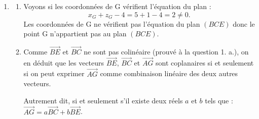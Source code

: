 \documentclass[10pt]{article}
\providecommand{\vect}[1]{\overrightarrow{#1}}
\begin{document}
\begin{enumerate}
\begin{enumerate}
\item Par propriété, on en déduit qu'une équation cartésienne du plan $(BCE)$ est de la forme $3\times x+0\times y+3\times z+d=0$.

B étant un point du plan $(BCE)$, ses coordonnées doivent vérifier l'équation du plan.
\[
B\in (BCE)\Longleftrightarrow 3\times 1+3\times 3+d=0
\Longleftrightarrow 12+d=0
\Longleftrightarrow d=-12.
\]
Une équation cartésienne du plan est donc $3x+3z-12=0$.

En divisant cette équation par 3 (qui est non nul), on obtient une équation équivalente, donc une équation du plan $(BCE)$ est bien : $x+z-4=0$.
\end{enumerate}

\item \begin{enumerate}
\item Voyons si les coordonnées de G vérifient l'équation du plan :
\[
x_G+z_G-4=5+1-4=2\neq 0.
\]
Les coordonnées de G ne vérifient pas l'équation du plan $(BCE)$ donc le point G n'appartient pas au plan $(BCE)$.

\item Comme $\vect{BE}$ et $\vect{BC}$ ne sont pas colinéaire (prouvé à la question 1. a.), on en déduit que les vecteurs $\vect{BE}$, $\vect{BC}$ et $\vect{AG}$ sont coplanaires si et seulement si on peut exprimer $\vect{AG}$ comme combinaison linéaire des deux autres vecteurs.

Autrement dit, si et seulement s'il existe deux réels $a$ et $b$ tels que : $\vect{AG}=a\vect{BC}+b\vect{BE}$.


\end{enumerate}
\end{enumerate}
\end{document}
